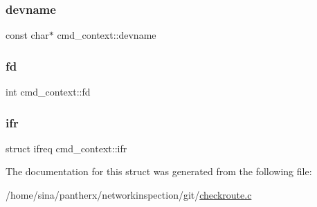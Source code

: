\mbox{\label{structcmd__context_a84ad9849705b15786daff0e543aea66d}} 
\subsubsection{\texorpdfstring{devname}{devname}}
{\footnotesize\ttfamily const char$\ast$ cmd\+\_\+context\+::devname}

\mbox{\label{structcmd__context_a3482941a7d95d94958fd026e984aaad6}} 
\subsubsection{\texorpdfstring{fd}{fd}}
{\footnotesize\ttfamily int cmd\+\_\+context\+::fd}

\mbox{\label{structcmd__context_a372549b7e45b707f07780719bc9f3b06}} 
\subsubsection{\texorpdfstring{ifr}{ifr}}
{\footnotesize\ttfamily struct ifreq cmd\+\_\+context\+::ifr}



The documentation for this struct was generated from the following file\+:\begin{DoxyCompactItemize}
\item 
/home/sina/pantherx/networkinspection/git/\hyperlink{checkroute_8c}{checkroute.\+c}\end{DoxyCompactItemize}
